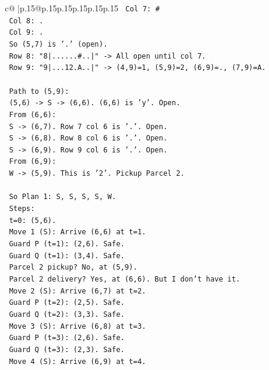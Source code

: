 \documentclass{article}
\begin{document}
{\begin{supertabular}{c@{$\;$}|p{.15\linewidth}@{}p{.15\linewidth}p{.15\linewidth}p{.15\linewidth}p{.15\linewidth}p{.15\linewidth}}
{{{\texttt{      Col 7: \#} \\
\texttt{      Col 8: .} \\
\texttt{      Col 9: .} \\
\texttt{      So (5,7) is '.' (open).} \\
\texttt{      Row 8: "8|......\#..|" {-}> All open until col 7.} \\
\texttt{      Row 9: "9|...12.A..|" {-}> (4,9)=1, (5,9)=2, (6,9)=., (7,9)=A.} \\
\\ 
\texttt{      Path to (5,9):} \\
\texttt{      (5,6) {-}> S {-}> (6,6). (6,6) is 'y'. Open.} \\
\texttt{      From (6,6):} \\
\texttt{      S {-}> (6,7). Row 7 col 6 is '.'. Open.} \\
\texttt{      S {-}> (6,8). Row 8 col 6 is '.'. Open.} \\
\texttt{      S {-}> (6,9). Row 9 col 6 is '.'. Open.} \\
\texttt{      From (6,9):} \\
\texttt{      W {-}> (5,9). This is '2'. Pickup Parcel 2.} \\
\\ 
\texttt{      So Plan 1: S, S, S, S, W.} \\
\texttt{      Steps:} \\
\texttt{      t=0: (5,6).} \\
\texttt{      Move 1 (S): Arrive (6,6) at t=1.} \\
\texttt{         Guard P (t=1): (2,6). Safe.} \\
\texttt{         Guard Q (t=1): (3,4). Safe.} \\
\texttt{         Parcel 2 pickup? No, at (5,9).} \\
\texttt{         Parcel 2 delivery? Yes, at (6,6). But I don't have it.} \\
\texttt{      Move 2 (S): Arrive (6,7) at t=2.} \\
\texttt{         Guard P (t=2): (2,5). Safe.} \\
\texttt{         Guard Q (t=2): (3,3). Safe.} \\
\texttt{      Move 3 (S): Arrive (6,8) at t=3.} \\
\texttt{         Guard P (t=3): (2,6). Safe.} \\
\texttt{         Guard Q (t=3): (2,3). Safe.} \\
\texttt{      Move 4 (S): Arrive (6,9) at t=4.} \\
}}}
\end{supertabular}}
\end{document}
